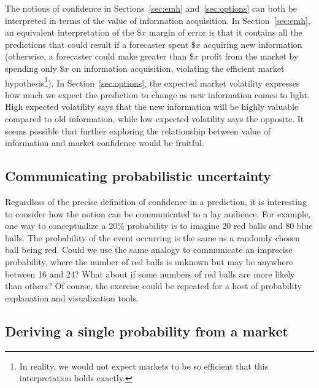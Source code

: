 \documentclass[sigconf,anonymous]{aamas}   %
\newcommand{\rupert}[1]{\ifnum\Chatty=1 \textcolor{red}   {Rupert: [#1]} \fi}
\begin{document}
The notions of confidence in Sections~\ref{sec:emh} and~\ref{sec:options} can both be interpreted in terms of the value of information acquisition. In Section~\ref{sec:emh}, an equivalent interpretation of the $\$x$ margin of error is that it contains all the predictions that could result if a forecaster spent $\$x$ acquiring new information (otherwise, a forecaster could make greater than $\$x$ profit from the market by spending only $\$x$ on information acquisition, violating the efficient market hypothesis\footnote{In reality, we would not expect markets to be so efficient that this interpretation holds exactly.}). In Section~\ref{sec:options}, the expected market volatility expresses how much we expect the prediction to change as new information comes to light. High expected volatility says that the new information will be highly valuable compared to old information, while low expected volatility says the opposite. It seems possible that further exploring the relationship between value of information and market confidence would be fruitful.


\subsection{Communicating probabilistic uncertainty}

Regardless of the precise definition of confidence in a prediction, it is interesting to consider how the notion can be communicated to a lay audience. For example, one way to conceptualize a 20\% probability is to imagine 20 red balls and 80 blue balls. The probability of the event occurring is the same as a randomly chosen ball being red. Could we use the same analogy to communicate an imprecise probability, where the number of red balls is unknown but may be anywhere between 16 and 24? What about if some numbers of red balls are more likely than others? Of course, the exercise could be repeated for a host of probability explanation and visualization tools.

\subsection{Deriving a single probability from a market}
\end{document}

